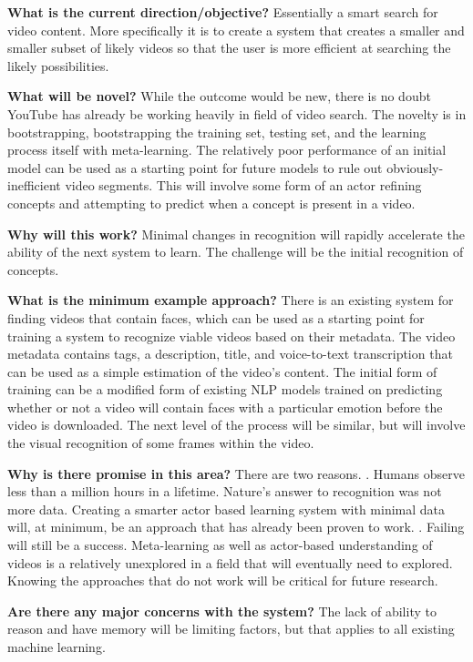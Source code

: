\documentclass{article}
\newcommand{\br}{ \hfill \break}
\begin{document}
%
%
%
\date{March 21 2020} \br \begin{adjustwidth}{2.5em}{0pt}

\textbf{What is the current direction/objective?} \br 
Essentially a smart search for video content. More specifically it is to create a system that creates a smaller and smaller subset of likely videos so that the user is more efficient at searching the likely possibilities. \br

\textbf{What will be novel?} \br 
While the outcome would be new, there is no doubt YouTube has already be working heavily in field of video search. The novelty  is in bootstrapping, bootstrapping the training set, testing set, and the learning process itself with meta-learning. The relatively poor performance of an initial model can be used as a starting point for future models to rule out obviously-inefficient video segments. This will involve some form of an actor refining concepts and attempting to predict when a concept is present in a video. \br 

\textbf{Why will this work?} \br 
Minimal changes in recognition will rapidly accelerate the ability of the next system to learn. The challenge will be the initial recognition of concepts.\br

\textbf{What is the minimum example approach?} \br 
There is an existing system for finding videos that contain faces, which can be used as a starting point for training a system to recognize viable videos based on their metadata. The video metadata contains tags, a description, title, and voice-to-text transcription that can be used as a simple estimation of the video's content. The initial form of training can be a modified form of existing NLP models trained on predicting whether or not a video will contain faces with a particular emotion before the video is downloaded. The next level of the process will be similar, but will involve the visual recognition of some frames within the video. \br

\textbf{Why is there promise in this area?} \br 
There are two reasons. \br
1. Humans observe less than a million hours in a lifetime. Nature's answer to recognition was not more data. Creating a smarter actor based learning system with minimal data will, at minimum, be an approach that has already been proven to work. \br 
2. Failing will still be a success. Meta-learning as well as actor-based understanding of videos is a relatively unexplored in a field that will eventually need to explored. Knowing the approaches that do not work will be critical for future research. \br

\textbf{Are there any major concerns with the system?} \br 
The lack of ability to reason and have memory will be limiting factors, but that applies to all existing machine learning. \br

\end{adjustwidth} \br 
\end{document}
